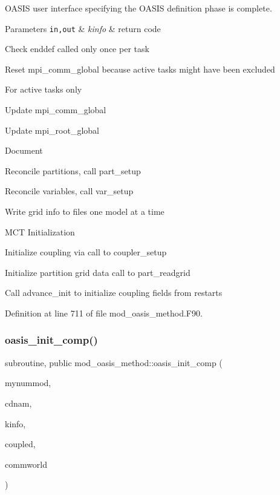 O\+A\+S\+IS user interface specifying the O\+A\+S\+IS definition phase is complete. 


\begin{DoxyParams}[1]{Parameters}
\mbox{\tt in,out}  & {\em kinfo} & return code \\
\hline
\end{DoxyParams}

\begin{DoxyItemize}
\item Check enddef called only once per task
\item Reset mpi\+\_\+comm\+\_\+global because active tasks might have been excluded
\item For active tasks only
\begin{DoxyItemize}
\item Update mpi\+\_\+comm\+\_\+global
\item Update mpi\+\_\+root\+\_\+global
\item Document
\item Reconcile partitions, call part\+\_\+setup
\item Reconcile variables, call var\+\_\+setup
\item Write grid info to files one model at a time
\item M\+CT Initialization
\item Initialize coupling via call to coupler\+\_\+setup
\item Initialize partition grid data call to part\+\_\+readgrid
\item Call advance\+\_\+init to initialize coupling fields from restarts 
\end{DoxyItemize}
\end{DoxyItemize}

Definition at line 711 of file mod\+\_\+oasis\+\_\+method.\+F90.

\mbox{\label{namespacemod__oasis__method_ad266b77f6e75f2d150c80374a841a43c}} 
\subsubsection{\texorpdfstring{oasis\+\_\+init\+\_\+comp()}{oasis\_init\_comp()}}
{\footnotesize\ttfamily subroutine, public mod\+\_\+oasis\+\_\+method\+::oasis\+\_\+init\+\_\+comp (\begin{DoxyParamCaption}\item[{integer (kind=ip\+\_\+intwp\+\_\+p), intent(out)}]{mynummod,  }\item[{character(len=$\ast$), intent(in)}]{cdnam,  }\item[{integer (kind=ip\+\_\+intwp\+\_\+p), intent(inout), optional}]{kinfo,  }\item[{logical, intent(in), optional}]{coupled,  }\item[{integer (kind=ip\+\_\+intwp\+\_\+p), intent(in), optional}]{commworld }\end{DoxyParamCaption})}



